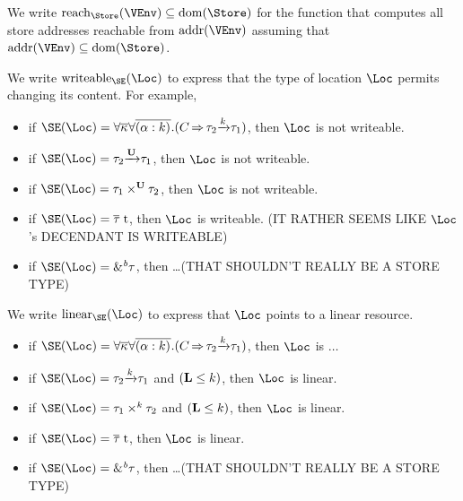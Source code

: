 We write $\Reach\Store\VEnv \subseteq \Dom\Store$ for the function
that computes all store addresses reachable from $\Addresses\VEnv$
assuming that $\Addresses\VEnv \subseteq \Dom\Store$. 

We write $\Writeable\SE\Loc$ to express that the type of location
$\Loc$ permits changing its content. For example,
\begin{itemize}
\item if $\SE (\Loc) =
  \forall\Multi\kvar\forall\Multi{\bvar{\alpha}{k}}.(\qual{C}{\tau_2\tarr{k}\tau_1})$,
  then $\Loc$ is not writeable.
\item if $\SE (\Loc) = \tau_2\tarr{\kun}{\tau_1}$, then $\Loc$ is not
  writeable.
\item if $\SE (\Loc) = \tyPair[\kun]{\tau_1}{\tau_2}$, then $\Loc$ is not writeable.
\item if $\SE (\Loc) = \tapp{t}{\Multi\tau}$, then $\Loc$ is
  writeable. (IT RATHER SEEMS LIKE $\Loc$'s DECENDANT IS WRITEABLE)
\item if $\SE (\Loc) = \borrow\tau$, then \dots (THAT SHOULDN'T REALLY
  BE A STORE TYPE)
\end{itemize}
We write $\Linear\SE\Loc$ to express that $\Loc$ points to a linear
resource.
\begin{itemize}
\item if $\SE (\Loc) =
  \forall\Multi\kvar\forall\Multi{\bvar{\alpha}{k}}.(\qual{C}{\tau_2\tarr{k}\tau_1})$,
  then $\Loc$ is $\dots$
\item if $\SE (\Loc) = \tau_2\tarr{k}{\tau_1}$ and $(\mathbf{L} \leq k)$, then $\Loc$ is linear.
\item if $\SE (\Loc) = \tyPair[k]{\tau_1}{\tau_2}$ and $(\mathbf{L} \leq k)$, then $\Loc$ is linear.
\item if $\SE (\Loc) = \tapp{t}{\Multi\tau}$, then $\Loc$ is linear.
\item if $\SE (\Loc) = \borrow\tau$, then \dots (THAT SHOULDN'T REALLY
  BE A STORE TYPE)
\end{itemize}
